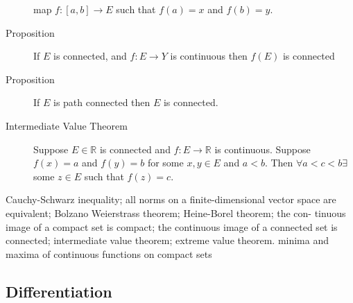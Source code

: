 \begin{description}
map $f:[a, b] \to E$ such that $f(a) = x$ and $f(b) = y$.
\item[Proposition] If $E$ is connected, and $f:E \to Y$ is continuous then $f(E)$ is connected
\item[Proposition] If $E$ is path connected then $E$ is connected.
\item[Intermediate Value Theorem] Suppose $E \in \mathbb{R}$ is connected and $f: E \to \mathbb{R}$
is continuous. Suppose $f(x) = a$ and $f(y) = b$ for some $x, y \in E$ and $a < b$.
Then $\forall a < c < b \exists$ some $z \in E$ such that $f(z) = c$.
\end{description}

Cauchy-Schwarz inequality; all norms on a finite-dimensional vector
space are equivalent; Bolzano Weierstrass theorem; Heine-Borel theorem; the con-
tinuous image of a compact set is compact; the continuous image of a connected
set is connected; intermediate value theorem; extreme value theorem. minima and
maxima of continuous functions on compact sets
\subsection{Differentiation}


